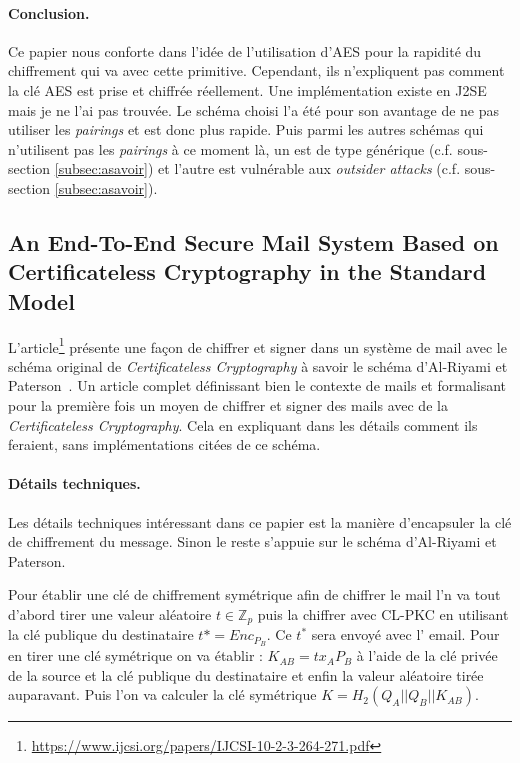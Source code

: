 \paragraph*{Conclusion.} Ce papier nous conforte dans l'idée de l'utilisation d'AES pour la rapidité du chiffrement qui va avec cette primitive. Cependant, ils n'expliquent pas comment la clé AES est prise et chiffrée réellement. Une implémentation existe en J2SE mais je ne l'ai pas trouvée. Le schéma choisi l'a été pour son avantage de ne pas utiliser les \textit{pairings} et est donc plus rapide. Puis parmi les autres schémas qui n'utilisent pas les \textit{pairings} à ce moment là, un est de type générique (c.f. sous-section \ref{subsec:asavoir}) et l'autre est vulnérable aux \textit{outsider attacks} (c.f. sous-section \ref{subsec:asavoir}).

\subsection{An End-To-End Secure Mail System Based on Certificateless Cryptography in the Standard Model}
L'article\footnote{\url{https://www.ijcsi.org/papers/IJCSI-10-2-3-264-271.pdf}} présente une façon de chiffrer et signer dans un système de mail avec le schéma original de \textit{Certificateless Cryptography} à savoir le schéma d'Al-Riyami et Paterson~\cite{DBLP:conf/asiacrypt/Al-RiyamiP03}. Un article complet définissant bien le contexte de mails et formalisant pour la première fois un moyen de chiffrer et signer des mails avec de la \textit{Certificateless Cryptography}. Cela en expliquant dans les détails comment ils feraient, sans implémentations citées de ce schéma.
\paragraph*{Détails techniques.} Les détails techniques intéressant dans ce papier est la manière d'encapsuler la clé de chiffrement du message. Sinon le reste s'appuie sur le schéma d'Al-Riyami et Paterson.

Pour établir une clé de chiffrement symétrique afin de chiffrer le mail l'n va tout d'abord tirer une valeur aléatoire $t \in \mathbb{Z}_p$ puis la chiffrer avec CL-PKC en utilisant la clé publique du destinataire $t* = Enc_{P_B}$. Ce $t^*$ sera envoyé avec l' email. Pour en tirer une clé symétrique on va établir : $K_{AB} = tx_AP_B$ à l'aide de la clé privée de la source et la clé publique du destinataire et enfin la valeur aléatoire tirée auparavant. Puis l'on va calculer la clé symétrique $K = H_2(Q_A||Q_B||K_{AB})$.

